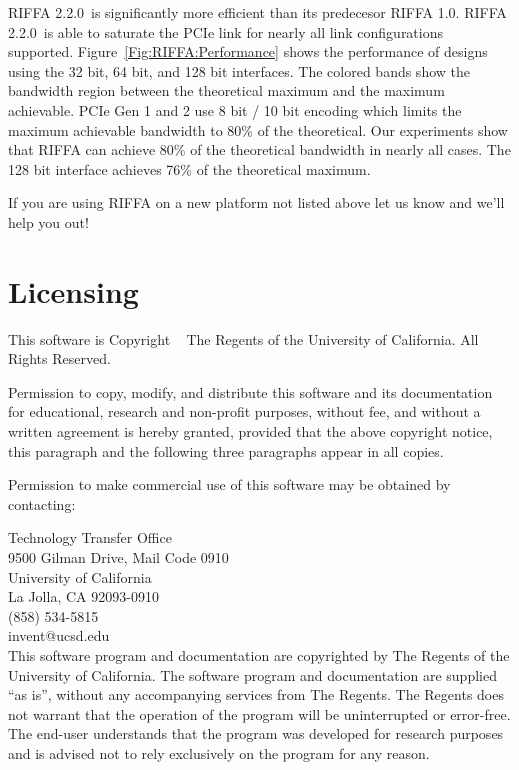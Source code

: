 \documentclass{refrep}
\newcommand{\RIFFAVer}{2.2.0}
\begin{document}
RIFFA \RIFFAVer~is significantly more efficient than its predecesor RIFFA
1.0. RIFFA \RIFFAVer~is able to saturate the PCIe link for nearly all link
configurations supported. Figure~\ref{Fig:RIFFA:Performance} shows the
performance of designs using the 32 bit, 64 bit, and 128 bit interfaces. The
colored bands show the bandwidth region between the theoretical maximum and the
maximum achievable. PCIe Gen 1 and 2 use 8 bit / 10 bit encoding which limits
the maximum achievable bandwidth to 80\% of the theoretical. Our experiments
show that RIFFA can achieve 80\% of the theoretical bandwidth in nearly all
cases. The 128 bit interface achieves 76\% of the theoretical maximum.

If you are using RIFFA on a new platform not listed above let us know and we’ll
help you out!

\section{Licensing}
This software is Copyright \the\year~ The Regents of the University of California. All
Rights Reserved.

Permission to copy, modify, and distribute this software and its documentation
for educational, research and non-profit purposes, without fee, and without a
written agreement is hereby granted, provided that the above copyright notice,
this paragraph and the following three paragraphs appear in all copies.

Permission to make commercial use of this software may be obtained by
contacting:

Technology Transfer Office\\
9500 Gilman Drive, Mail Code 0910\\
University of California\\
La Jolla, CA 92093-0910\\
(858) 534-5815\\
invent@ucsd.edu\\

This software program and documentation are copyrighted by The Regents of the
University of California. The software program and documentation are supplied
``as is'', without any accompanying services from The Regents. The Regents does
not warrant that the operation of the program will be uninterrupted or
error-free. The end-user understands that the program was developed for research
purposes and is advised not to rely exclusively on the program for any reason.
\end{document}
